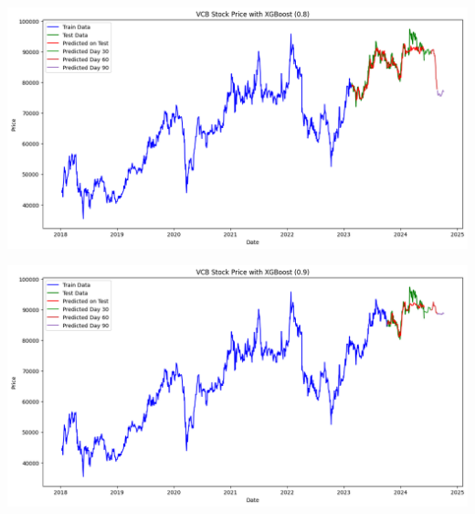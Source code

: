 \documentclass[conference]{IEEEtran}
\begin{document}
\begin{minipage}{0.23\textwidth}
    \centering
    \includegraphics[width=\linewidth]{images/XGBoost/XGBoost_VCB_82.png}
    \label{fig:image1}
\end{minipage}
\hfill
\begin{minipage}{0.23\textwidth}
    \centering
    \includegraphics[width=\linewidth]{images/XGBoost/XGBoost_VCB_91.png}
    \label{fig:image2}
\end{minipage}
\end{document}
